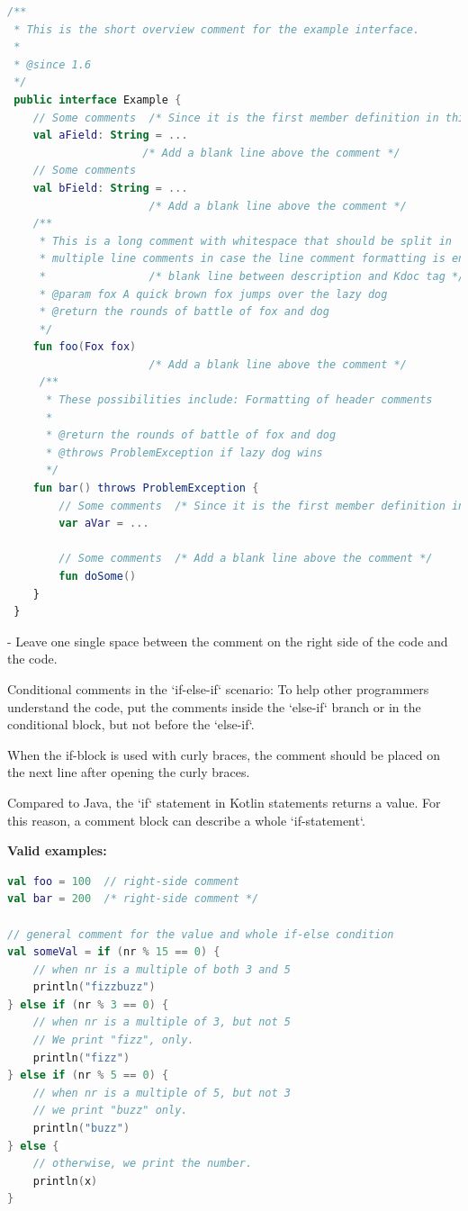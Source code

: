 \begin{lstlisting}[language=Kotlin]
/** 
 * This is the short overview comment for the example interface.
 * 
 * @since 1.6
 */
 public interface Example {
    // Some comments  /* Since it is the first member definition in this code block, there is no need to add a blank line here */
    val aField: String = ...
                     /* Add a blank line above the comment */
    // Some comments
    val bField: String = ...
                      /* Add a blank line above the comment */
    /**
     * This is a long comment with whitespace that should be split in 
     * multiple line comments in case the line comment formatting is enabled.
     *                /* blank line between description and Kdoc tag */
     * @param fox A quick brown fox jumps over the lazy dog
     * @return the rounds of battle of fox and dog 
     */
    fun foo(Fox fox)
                      /* Add a blank line above the comment */
     /**
      * These possibilities include: Formatting of header comments
      * 
      * @return the rounds of battle of fox and dog
      * @throws ProblemException if lazy dog wins
      */
    fun bar() throws ProblemException {
        // Some comments  /* Since it is the first member definition in this range, there is no need to add a blank line here */
        var aVar = ...

        // Some comments  /* Add a blank line above the comment */            
        fun doSome()
    }
 }
\end{lstlisting}


- Leave one single space between the comment on the right side of the code and the code. 

Conditional comments in the `if-else-if` scenario: To help other programmers understand the code, put the comments inside the `else-if` branch or in the conditional block, but not before the `else-if`.

When the if-block is used with curly braces, the comment should be placed on the next line after opening the curly braces.

Compared to Java, the `if` statement in Kotlin statements returns a value. For this reason, a comment block can describe a whole `if-statement`.



\textbf{Valid examples:}



\begin{lstlisting}[language=Kotlin]
val foo = 100  // right-side comment
val bar = 200  /* right-side comment */

// general comment for the value and whole if-else condition
val someVal = if (nr % 15 == 0) {
    // when nr is a multiple of both 3 and 5
    println("fizzbuzz")
} else if (nr % 3 == 0) {
    // when nr is a multiple of 3, but not 5
    // We print "fizz", only.
    println("fizz")
} else if (nr % 5 == 0) {
    // when nr is a multiple of 5, but not 3
    // we print "buzz" only.
    println("buzz")
} else {
    // otherwise, we print the number.
    println(x)
}
\end{lstlisting}


